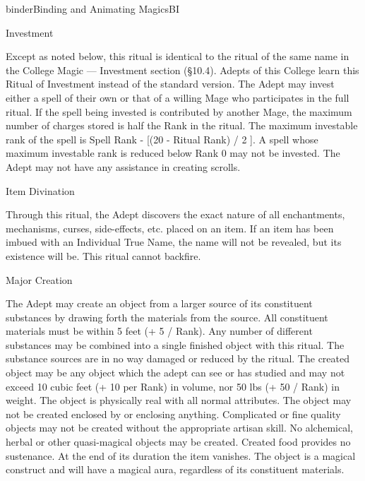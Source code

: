 \begin{College}[1.2]{binder}{Binding and Animating Magics}{BI}
\begin{ritual}[R-2]{Investment}
\begin{effects}
Except as noted below, this ritual is identical to the ritual of the
same name in the College Magic --- Investment section (§10.4).  Adepts
of this College learn this Ritual of Investment instead of the
standard version.  The Adept may invest either a spell of their own or
that of a willing Mage who participates in the full ritual. If the
spell being invested is contributed by another Mage, the maximum
number of charges stored is half the Rank in the ritual.  The maximum
investable rank of the spell is Spell Rank - [(20 - Ritual Rank) / 2
].  A spell whose maximum investable rank is reduced below Rank 0 may
not be invested. The Adept may not have any assistance in creating
scrolls.
\end{effects}
\end{ritual}

\begin{ritual}[R-3]{Item Divination}
\begin{effects}
Through this ritual, the Adept discovers the exact nature of all
enchantments, mechanisms, curses, side-effects, etc.  placed on an
item.  If an item has been imbued with an Individual True Name, the
name will not be revealed, but its existence will be. This ritual
cannot backfire.
\end{effects}
\end{ritual}

\begin{ritual}[R-4]{Major Creation}
\begin{effects}
The Adept may create an object from a larger source of its constituent
substances by drawing forth the materials from the source.  All
constituent materials must be within 5 feet (+ 5 / Rank). Any number
of different substances may be combined into a single finished object
with this ritual.  The substance sources are in no way damaged or
reduced by the ritual.  The created object may be any object which the
adept can see or has studied and may not exceed 10 cubic feet (+ 10
per Rank) in volume, nor 50 lbs (+ 50 / Rank) in weight.  The object
is physically real with all normal attributes.  The object may not be
created enclosed by or enclosing anything.  Complicated or fine
quality objects may not be created without the appropriate artisan
skill.  No alchemical, herbal or other quasi-magical objects may be
created.  Created food provides no sustenance. At the end of its
duration the item vanishes. The object is a magical construct and will
have a magical aura, regardless of its constituent materials.
\end{effects}
\end{ritual}


\end{College}

